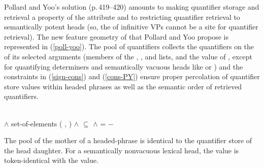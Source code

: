 \documentclass[output=paper
	        ,collection
	        ,collectionchapter
 	        ,biblatex
                ,babelshorthands
                ,newtxmath
                ,draftmode
                ,colorlinks, citecolor=brown
]{langscibook}
\begin{document}
Pollard and Yoo's solution (p.\,419--420) amounts to making quantifier storage and retrieval a property of the  attribute and to restricting quantifier retrieval to semantically potent heads (so, the  of infinitive VPs cannot be a site for quantifier retrieval). The new feature geometry of  that Pollard and Yoo propose is represented in (\ref{poll-yoo}). The pool of quantifiers collects the quantifiers on the  of its selected arguments (members of the , , and  lists, and the value of , except for quantifying determiners and semantically vacuous heads like  or ) and the constraints in (\ref{sign-cons}) and (\ref{cons-PY}) \citep[423]{PollardandYoo1998} ensure proper percolation of quantifier store values within headed phrases as well as the semantic order of retrieved quantifiers.

\begin{exe}
\ex\label{poll-yoo}

\end{exe}

\begin{exe}
\ex\label{sign-cons}
 \\
$\land$ set-of-elements ( , )
$\land$  $\subseteq$ 
$\land$  =  $-$ 
\end{exe}

\begin{exe}
\ex\label{cons-PY}
\begin{xlist}
\ex \label{cons-PYa} The pool of the mother of a headed-phrase is identical to the quantifier store of the head daughter. 
\ex \label{cons-PYb} For a semantically nonvacuous lexical head, the  value is token-identical with the  value.
\end{xlist}
\end{exe}
\end{document}
